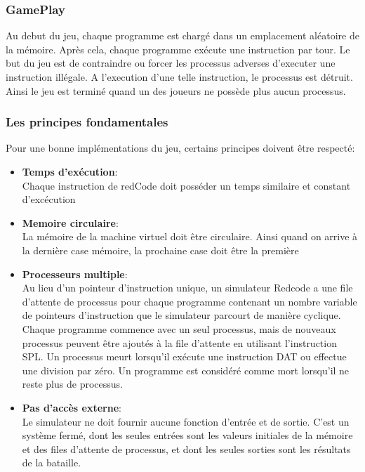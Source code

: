 \documentclass[12pt]{article}
\begin{document}
\subsubsection{GamePlay}
Au debut du jeu, chaque programme est chargé dans un emplacement aléatoire de la mémoire. Après cela, chaque programme exécute une instruction par tour. Le but du jeu est de contraindre ou forcer les processus adverses d'executer une instruction illégale. A l'execution d'une telle instruction, le processus est détruit. Ainsi le jeu est terminé quand un des joueurs ne possède plus aucun processus.
\subsubsection{Les principes fondamentales}
Pour une bonne implémentations du jeu, certains principes doivent être respecté:
\begin{itemize}
	\item \textbf{Temps d'exécution}: \\
	      Chaque instruction de redCode doit posséder un  temps similaire et constant d'excécution
	\item \textbf{Memoire circulaire}: \\
	      La mémoire de la machine virtuel doit être circulaire. Ainsi quand on arrive à la dernière case mémoire, la prochaine case doit être la première

	\item \textbf{Processeurs multiple}: \\
	      Au lieu d'un pointeur d'instruction unique, un simulateur Redcode a une file d'attente de processus pour chaque programme contenant un nombre variable de pointeurs d'instruction que le simulateur parcourt de manière cyclique. Chaque programme commence avec un seul processus, mais de nouveaux processus peuvent être ajoutés à la file d'attente en utilisant l'instruction SPL. Un processus meurt lorsqu'il exécute une instruction DAT ou effectue une division par zéro. Un programme est considéré comme mort lorsqu'il ne reste plus de processus.

	\item \textbf{Pas d'accès externe}: \\
	      Le simulateur ne doit fournir aucune fonction d'entrée et de sortie. C'est un système fermé, dont les seules entrées sont les valeurs initiales de la mémoire et des files d'attente de processus, et dont les seules sorties sont les résultats de la bataille.
\end{itemize}
\end{document}

